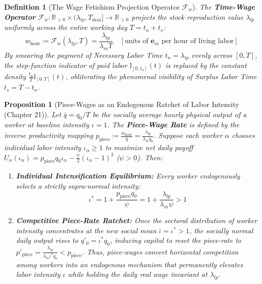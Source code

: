 \documentclass[11pt,a4paper]{article}
\newtheorem{definition}{Definition}[section]
\newtheorem{proposition}{Proposition}[section]
\begin{document}
\begin{definition}[The Wage Fetishism Projection Operator $\mathcal{F}_w$]
The \textbf{Time-Wage Operator} $\mathcal{F}_w : \mathbb{R}_{>0} \times (\lambda_{lp}, T_{\max}] \to \mathbb{R}_{>0}$ projects the stock reproduction value $\lambda_{lp}$ uniformly across the entire working day $T = t_n + t_s$:
\begin{equation}
    w_{\text{hour}} \coloneqq \mathcal{F}_w(\lambda_{lp}, T) = \frac{\lambda_{lp}}{\lambda_m T} \quad \left[\text{units of } \mathbf{e}_m \text{ per hour of living labor}\right]
\end{equation}
By smearing the payment of Necessary Labor Time $t_n = \lambda_{lp}$ evenly across $[0, T]$, the step-function indicator of paid labor $\mathbb{I}_{[0, t_n]}(t)$ is replaced by the constant density $\frac{t_n}{T} \mathbb{I}_{[0, T]}(t)$, obliterating the phenomenal visibility of Surplus Labor Time $t_s = T - t_n$.
\end{definition}

\begin{proposition}[Piece-Wages as an Endogenous Ratchet of Labor Intensity (Chapter 21)]
Let $\bar{q} = q_0 / T$ be the socially average hourly physical output of a worker at baseline intensity $\iota = 1$. The \textbf{Piece-Wage Rate} is defined by the inverse productivity mapping $p_{\text{piece}} \coloneqq \frac{w_{\text{hour}}}{\bar{q}} = \frac{\lambda_{lp}}{\lambda_m q_0}$. Suppose each worker $\alpha$ chooses individual labor intensity $\iota_\alpha \ge 1$ to maximize net daily payoff $U_\alpha(\iota_\alpha) = p_{\text{piece}} q_0 \iota_\alpha - \frac{\psi}{2}(\iota_\alpha - 1)^2$ ($\psi > 0$). Then:
\begin{enumerate}[label=(\roman*)]
    \item \textbf{Individual Intensification Equilibrium:} Every worker endogenously selects a strictly supra-normal intensity:
    \begin{equation}
        \iota^* = 1 + \frac{p_{\text{piece}} q_0}{\psi} = 1 + \frac{\lambda_{lp}}{\lambda_m \psi} > 1
    \end{equation}
    \item \textbf{Competitive Piece-Rate Ratchet:} Once the sectoral distribution of worker intensity concentrates at the new social mean $\bar{\iota} = \iota^* > 1$, the socially normal daily output rises to $q'_0 = \iota^* q_0$, inducing capital to reset the piece-rate to $p'_{\text{piece}} = \frac{\lambda_{lp}}{\lambda_m \iota^* q_0} < p_{\text{piece}}$. Thus, piece-wages convert horizontal competition among workers into an endogenous mechanism that permanently elevates labor intensity $\iota$ while holding the daily real wage invariant at $\lambda_{lp}$.
\end{enumerate}
\end{proposition}
\end{document}
